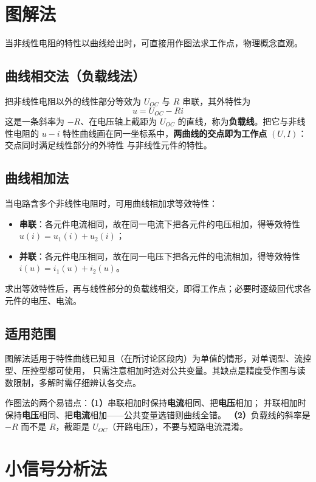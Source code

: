 \section{图解法}

当非线性电阻的特性以曲线给出时，可直接用作图法求工作点，物理概念直观。

\subsection{曲线相交法（负载线法）}
把非线性电阻以外的线性部分等效为 $U_{OC}$ 与 $R$ 串联，其外特性为
\begin{equation}
  u=U_{OC}-Ri
\end{equation}
这是一条斜率为 $-R$、在电压轴上截距为 $U_{OC}$ 的直线，称为\textbf{负载线}。把它与非线性电阻的
$u-i$ 特性曲线画在同一坐标系中，\textbf{两曲线的交点即为工作点} $(U,I)$：交点同时满足线性部分的外特性
与非线性元件的特性。

\subsection{曲线相加法}
当电路含多个非线性电阻时，可用曲线相加求等效特性：
\begin{itemize}
  \item \textbf{串联}：各元件电流相同，故在同一电流下把各元件的电压相加，得等效特性 $u(i)=u_1(i)+u_2(i)$；
  \item \textbf{并联}：各元件电压相同，故在同一电压下把各元件的电流相加，得等效特性 $i(u)=i_1(u)+i_2(u)$。
\end{itemize}
求出等效特性后，再与线性部分的负载线相交，即得工作点；必要时逐级回代求各元件的电压、电流。

\subsection{适用范围}
图解法适用于特性曲线已知且（在所讨论区段内）为单值的情形，对单调型、流控型、压控型都可使用，
只需注意相加时选对公共变量。其缺点是精度受作图与读数限制，多解时需仔细辨认各交点。

\begin{corepoint}{作图法的两个易错点：\textbf{（1）}串联相加时保持\textbf{电流}相同、把\textbf{电压}相加；
并联相加时保持\textbf{电压}相同、把\textbf{电流}相加——公共变量选错则曲线全错。
\textbf{（2）}负载线的斜率是 $-R$ 而不是 $R$，截距是 $U_{OC}$（开路电压），不要与短路电流混淆。}
\end{corepoint}

\section{小信号分析法}

